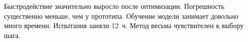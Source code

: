 Быстродействие значительно выросло после оптимизации. %
Погрешность существенно меньше, чем у прототипа. %
Обучение модели занимает довольно много времени. %
Испытания заняли 12~ч. Метод весьма чувствителен к выбору шага. %
